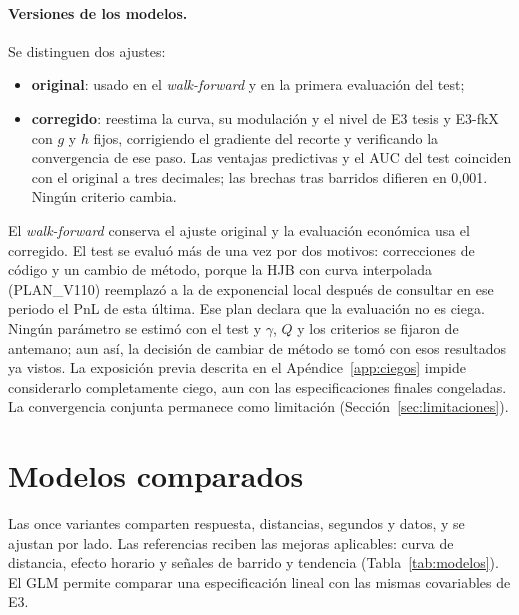 \paragraph{Versiones de los modelos.} Se distinguen dos ajustes:
\begin{itemize}[nosep]
\item \textbf{original}: usado en el \textit{walk-forward} y en la primera evaluación del test;
\item \textbf{corregido}: reestima la curva, su modulación y el nivel de E3 tesis y E3-fkX con $g$ y $h$ fijos, corrigiendo el gradiente del recorte y verificando la convergencia de ese paso. Las ventajas predictivas y el AUC del test coinciden con el original a tres decimales; las brechas tras barridos difieren en 0,001. Ningún criterio cambia.
\end{itemize}
El \textit{walk-forward} conserva el ajuste original y la evaluación económica usa el corregido. El test se evaluó más de una vez por dos motivos: correcciones de código y un cambio de método, porque la HJB con curva interpolada (PLAN\_V110) reemplazó a la de exponencial local después de consultar en ese periodo el PnL de esta última. Ese plan declara que la evaluación no es ciega. Ningún parámetro se estimó con el test y $\gamma$, $Q$ y los criterios se fijaron de antemano; aun así, la decisión de cambiar de método se tomó con esos resultados ya vistos. La exposición previa descrita en el Apéndice~\ref{app:ciegos} impide considerarlo completamente ciego, aun con las especificaciones finales congeladas. La convergencia conjunta permanece como limitación (Sección~\ref{sec:limitaciones}).

\section{Modelos comparados}
\label{sec:modelos}
Las once variantes comparten respuesta, distancias, segundos y datos, y se ajustan por lado. Las referencias reciben las mejoras aplicables: curva de distancia, efecto horario y señales de barrido y tendencia (Tabla~\ref{tab:modelos}). El GLM permite comparar una especificación lineal con las mismas covariables de E3.

